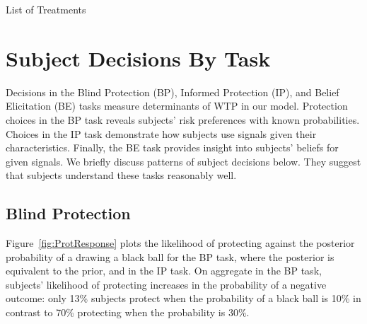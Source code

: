 \documentclass[12pt,a4paper]{article}
\begin{document}
\begin{table}[h!]
\caption{List of Treatments} \label{tab:treatments}

\end{table}


 


\vspace{20pt}
\section{Subject Decisions By Task}\label{sec:sanity}

Decisions in the Blind Protection (BP), Informed Protection (IP), and Belief Elicitation (BE) tasks measure determinants of WTP in our model. Protection choices in the BP task reveals subjects' risk preferences with known probabilities. Choices in the IP task demonstrate how subjects use signals given their characteristics. Finally, the BE task provides insight into subjects' beliefs for given signals.  We briefly discuss patterns of subject decisions below. They suggest that subjects understand these tasks reasonably well.

\subsection{Blind Protection}

Figure~\ref{fig:ProtResponse} plots the likelihood of protecting against the posterior probability of a drawing a black ball for the BP task, where the posterior is equivalent to the prior, and in the IP task. On aggregate in the BP task, subjects' likelihood of protecting increases in the probability of a negative outcome: only 13\% subjects protect when the probability of a black ball is 10\% in contrast to 70\% protecting when the probability is 30\%. 
\end{document}
